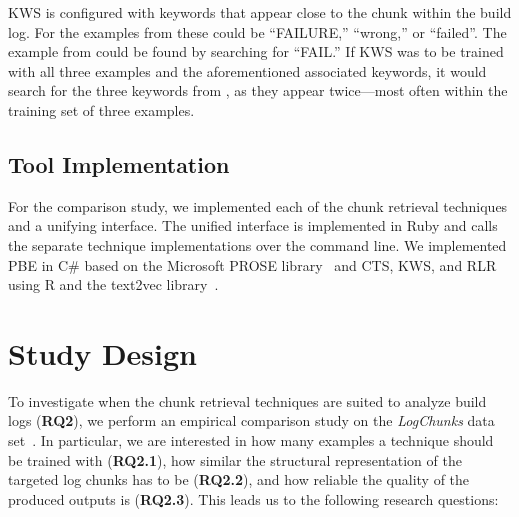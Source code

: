 KWS is configured with keywords that appear close to the chunk within
the build log.
For the examples from  these could be
``FAILURE,'' ``wrong,'' or ``failed''.
The example from  could be found
by searching for ``FAIL.''
If KWS was to be trained with all three examples and the aforementioned
associated keywords, it would search for the three keywords from
, as they appear twice---most often within
the training set of three examples.

\subsection{Tool Implementation}
For the comparison study, we implemented each of the chunk retrieval
techniques and a unifying interface.
The unified interface is implemented in Ruby and
calls the separate technique implementations over the command line.
We implemented PBE in C\# based on the Microsoft PROSE
library~\cite{prose2019webpage} and CTS, KWS, and RLR using
R and the text2vec library~\cite{text2vec2019webpage}.

\section{Study Design}


\label{sec:study}

To investigate when the chunk retrieval techniques are suited to
analyze build logs (\textbf{RQ2}), we perform an empirical comparison
study on the \emph{LogChunks} data set~\cite{brandt2020logchunks}.
In particular, we are interested in how many examples a technique
should be trained with (\textbf{RQ2.1}),
how similar the structural representation of the targeted log chunks
has to be (\textbf{RQ2.2}), and how reliable the quality of the
produced outputs is (\textbf{RQ2.3}).
This leads us to the following research questions:

